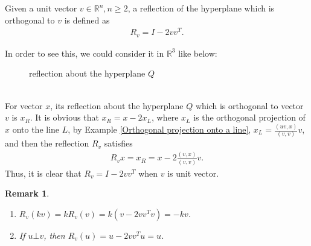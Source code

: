 \documentclass[11pt]{book}
\newtheorem{remark}{Remark}[section]
\theoremstyle{definition}
\numberwithin{equation}{chapter}
\begin{document}
\begin{subappendices}
Given a unit vector $v \in \mathbb{R}^n, n \geq 2$, a reflection of the hyperplane which is orthogonal to $v$ is defined as 
\begin{align*}
    R_v = I - 2 v v^T.
\end{align*}

In order to see this, we could consider it in $\mathbb{R}^3$ like below:\\
\begin{figure}[h]
    \centering
    \caption{reflection about the hyperplane $Q$}
    \label{fig:plot_2}
\end{figure}\\
For vector $x$, its reflection about the hyperplane $Q$ which is orthogonal to vector $v$ is $x_R$. It is obvious that $x_R = x - 2 x_L$, where $x_L$ is the orthogonal projection of $x$ onto the line $L$, by Example \ref{Orthogonal projection onto a line}, $x_L = \frac{(uv,x)}{(v,v)}v$, and then the reflection $R_v$ satisfies
\begin{align*}
    R_v x = x_R = x - 2 \frac{(v,x)}{(v,v)}v.
\end{align*}
Thus, it is clear that $R_v = I - 2 v v^T$ when $v$ is unit vector. 

\begin{remark}
~\begin{enumerate}[label=(\arabic*)]
    \item $R_v(kv) = k R_v(v) = k (v - 2 v v^T v) = -kv$.
    
    \item If $u \bot v$, then $R_v(u) = u - 2 v v^T u = u$.
\end{enumerate}
\end{remark}


\end{subappendices}
\end{document}
